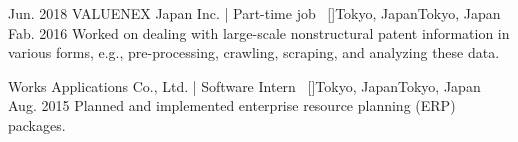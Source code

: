 \begin{experiences}
\emptySeparator
\researchexperience
    {Jun. 2018}   {VALUENEX Japan Inc. | Part-time job{\normalfont  ~ [\href{https://en.valuenex.com/en/home}{\small{\websiteSymbol}}]}}{Tokyo, Japan}{Tokyo, Japan}
    {Fab. 2016} {
        Worked on dealing with large-scale nonstructural patent information in various forms, e.g., pre-processing, crawling, scraping, and analyzing these data.
    }    

\emptySeparator
\researchexperience
    {}   {Works Applications Co., Ltd. | Software Intern{\normalfont  ~ [\href{https://www.worksap.com/}{\small{\websiteSymbol}}]}}{Tokyo, Japan}{Tokyo, Japan}
    {Aug. 2015} {
        Planned and implemented enterprise resource planning (ERP) packages.
    }    




\end{experiences}
